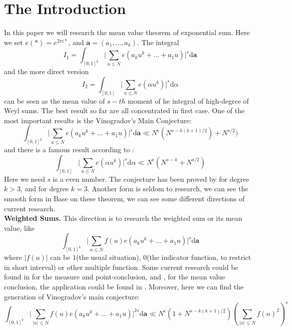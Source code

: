 \documentclass[10pt]{article}
\begin{document}
\section{The Introduction}
In this paper we will research the mean value theorem of exponential sum. Here we set $e(*)=e^{2\pi i*}$, and $\textbf{a}=(a_1,...,a_k)$.  The integral
\begin{equation}
I_1=\int_{[0,1]^k}\bigg|\sum\limits_{u\leq N}e(a_ku^k+...+a_1u)\bigg|^{s}\mathrm{d}\textbf{a}
\end{equation}
and the more direct version
\begin{equation}
I_2=\int_{[0,1]}\bigg|\sum\limits_{u\leq N}e(\alpha u^k)\bigg|^{s}\mathrm{d}\alpha
\end{equation}
can be seen as the mean value of $s-th$ moment of he integral of high-degree of Weyl sums. The best result so far are all concentrated in first case. One of the most important results is the Vinogradov's Main Conjecture:
\[
\int_{[0,1]^k}\bigg|\sum\limits_{u\leq N}e(a_ku^k+...+a_1u)\bigg|^{s}\mathrm{d}\textbf{a}\ll N^{\epsilon}(N^{s-k(k+1)/2})+N^{s/2})
\]
and there is a famous result according to \cite{wooley2015discretefourierrestrictionefficient}:
\[
\int_{[0,1]}\bigg|\sum\limits_{u\leq N}e(\alpha u^k)\bigg|^{s}\mathrm{d}\alpha\ll N^{\epsilon}(N^{s-k}+N^{s/2})
\]
Here we need $s$ is a even number. The conjecture has been proved by \cite{bourgain2016proofmainconjecturevinogradovs} for degree $k>3$, and \cite{wooley2014cubiccasemainconjecture} for degree $k=3$. Another form is seldom to research, we can see the smooth form in \cite{bruedern2024estimatessmoothweylsums} 
Base on these theorem, we can see some different directions of current research.\\
\textbf{Weighted Sums.} This direction is to research the weighted sum or its mean value, like
\[
\int_{[0,1]^k}\bigg|\sum\limits_{u\leq N}f(u)e(a_ku^k+...+a_1u)\bigg|^{s}\mathrm{d}\textbf{a}
\]
where $|f(u)|$ can be $1$(the usual situation), $0$(the indicator function, to restrict in short interval) or other multiple function. Some current research could be found in \cite{chen2020metrictheoryweylsums} for the measure and point-conclusion, and \cite{wooley2015discretefourierrestrictionefficient}, for the mean value conclusion, the application could be found in \cite{wei2014sumspowersequalprimes}.
Moreover, here we can find the generation of Vinogradov's main conjecture:
\[
\int_{[0,1]^k}\bigg|\sum\limits_{|u|\leq N}f(u)e(a_ku^k+...+a_1u)\bigg|^{2s}\mathrm{d}\textbf{a}\ll N^{\epsilon}(1+N^{s-k(k+1)/2})(\sum\limits_{|n|\leq N}f(n)^2)^s
\]
\end{document}
